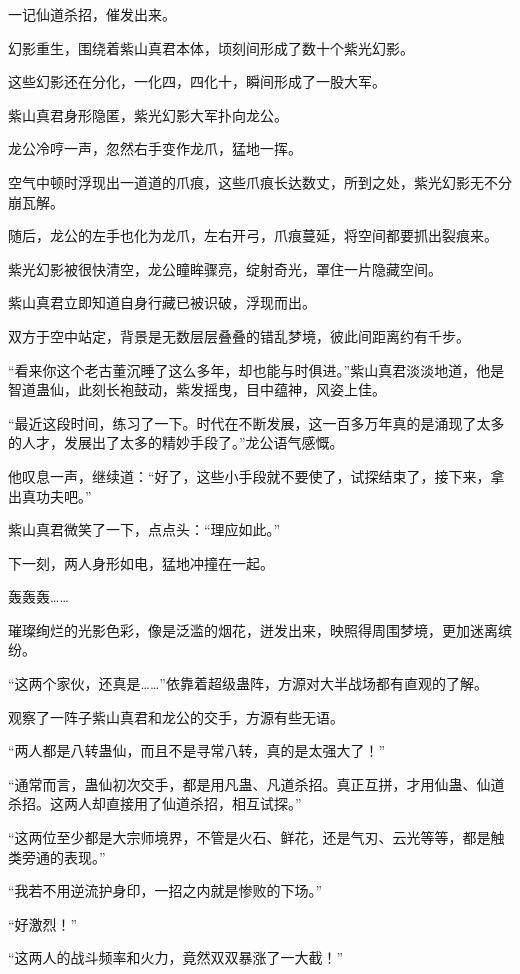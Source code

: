 \begin{this_body}
一记仙道杀招，催发出来。

幻影重生，围绕着紫山真君本体，顷刻间形成了数十个紫光幻影。

这些幻影还在分化，一化四，四化十，瞬间形成了一股大军。

紫山真君身形隐匿，紫光幻影大军扑向龙公。

龙公冷哼一声，忽然右手变作龙爪，猛地一挥。

空气中顿时浮现出一道道的爪痕，这些爪痕长达数丈，所到之处，紫光幻影无不分崩瓦解。

随后，龙公的左手也化为龙爪，左右开弓，爪痕蔓延，将空间都要抓出裂痕来。

紫光幻影被很快清空，龙公瞳眸骤亮，绽射奇光，罩住一片隐藏空间。

紫山真君立即知道自身行藏已被识破，浮现而出。

双方于空中站定，背景是无数层层叠叠的错乱梦境，彼此间距离约有千步。

“看来你这个老古董沉睡了这么多年，却也能与时俱进。”紫山真君淡淡地道，他是智道蛊仙，此刻长袍鼓动，紫发摇曳，目中蕴神，风姿上佳。

“最近这段时间，练习了一下。时代在不断发展，这一百多万年真的是涌现了太多的人才，发展出了太多的精妙手段了。”龙公语气感慨。

他叹息一声，继续道：“好了，这些小手段就不要使了，试探结束了，接下来，拿出真功夫吧。”

紫山真君微笑了一下，点点头：“理应如此。”

下一刻，两人身形如电，猛地冲撞在一起。

轰轰轰……

璀璨绚烂的光影色彩，像是泛滥的烟花，迸发出来，映照得周围梦境，更加迷离缤纷。

“这两个家伙，还真是……”依靠着超级蛊阵，方源对大半战场都有直观的了解。

观察了一阵子紫山真君和龙公的交手，方源有些无语。

“两人都是八转蛊仙，而且不是寻常八转，真的是太强大了！”

“通常而言，蛊仙初次交手，都是用凡蛊、凡道杀招。真正互拼，才用仙蛊、仙道杀招。这两人却直接用了仙道杀招，相互试探。”

“这两位至少都是大宗师境界，不管是火石、鲜花，还是气刃、云光等等，都是触类旁通的表现。”

“我若不用逆流护身印，一招之内就是惨败的下场。”

“好激烈！”

“这两人的战斗频率和火力，竟然双双暴涨了一大截！”


\end{this_body}
